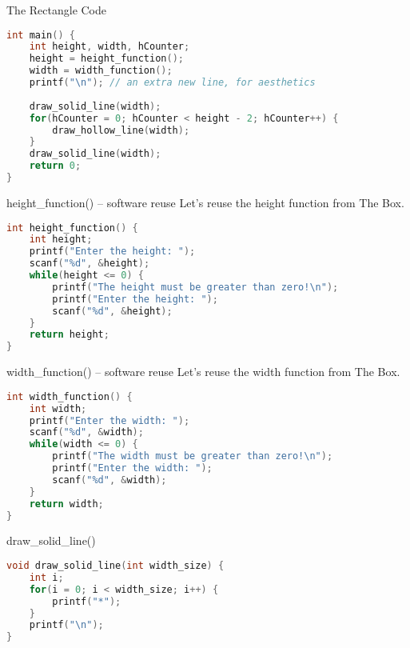 \documentclass[graphics]{beamer}
\begin{document}
\begin{frame}[fragile]{The Rectangle Code}
    \begin{lstlisting}[language=C,basicstyle=\footnotesize,keywordstyle=\color{blue},commentstyle=\color{green},showstringspaces=false,stringstyle=\color{red}]
int main() {
    int height, width, hCounter;
    height = height_function();
    width = width_function();
    printf("\n"); // an extra new line, for aesthetics
    
    draw_solid_line(width);
    for(hCounter = 0; hCounter < height - 2; hCounter++) {
        draw_hollow_line(width);
    }
    draw_solid_line(width);
    return 0;
}
    \end{lstlisting}
\end{frame}

\begin{frame}[fragile]{height\_function() -- software reuse}
    Let's reuse the height function from The Box.
    \begin{lstlisting}[language=C,basicstyle=\footnotesize,keywordstyle=\color{blue},commentstyle=\color{green},showstringspaces=false,stringstyle=\color{red}]
int height_function() {
    int height;
    printf("Enter the height: ");
    scanf("%d", &height);
    while(height <= 0) {
        printf("The height must be greater than zero!\n");
        printf("Enter the height: ");
        scanf("%d", &height);
    }
    return height;
}
    \end{lstlisting}
\end{frame}

\begin{frame}[fragile]{width\_function() -- software reuse}
    Let's reuse the width function from The Box.
    \begin{lstlisting}[language=C,basicstyle=\footnotesize,keywordstyle=\color{blue},commentstyle=\color{green},showstringspaces=false,stringstyle=\color{red}]
int width_function() {
    int width;
    printf("Enter the width: ");
    scanf("%d", &width);
    while(width <= 0) {
        printf("The width must be greater than zero!\n");
        printf("Enter the width: ");
        scanf("%d", &width);
    }
    return width;
}
    \end{lstlisting}
\end{frame}

\begin{frame}[fragile]{draw\_solid\_line()}
    \begin{lstlisting}[language=C,basicstyle=\footnotesize,keywordstyle=\color{blue},commentstyle=\color{green},showstringspaces=false,stringstyle=\color{red}]
void draw_solid_line(int width_size) {
    int i;
    for(i = 0; i < width_size; i++) {
        printf("*");
    }
    printf("\n");
}
    \end{lstlisting}
\end{frame}
\end{document}
